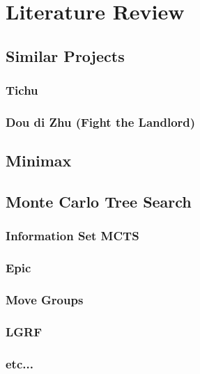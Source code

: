 \section{Literature Review}



\subsection{Similar Projects}
\subsubsection{Tichu}


\subsubsection{Dou di Zhu (Fight the Landlord)}

\subsection{Minimax}

\subsection{Monte Carlo Tree Search}
\subsubsection{Information Set MCTS}
\subsubsection{Epic}
\subsubsection{Move Groups}
\subsubsection{LGRF}
\subsubsection{etc...}
